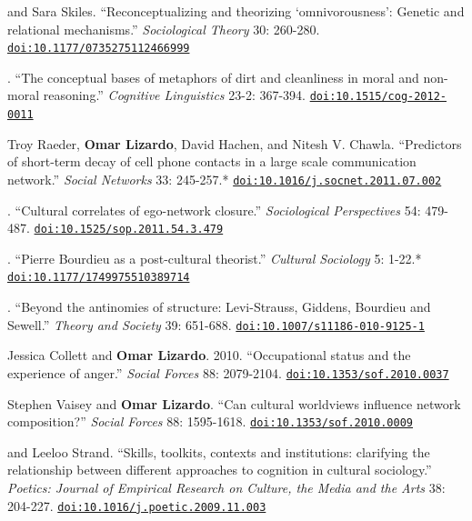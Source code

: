

 and Sara Skiles. ``Reconceptualizing and theorizing ‘omnivorousness’: Genetic and relational mechanisms.'' {\em Sociological Theory} 30: 260-280. \href{https://doi.org/10.1177/0735275112466999}{\nolinkurl{doi:10.1177/0735275112466999}}

.  ``The conceptual bases of metaphors of dirt and cleanliness in moral and non-moral reasoning.'' {\em Cognitive Linguistics} 23-2: 367-394. \href{https://doi.org/10.1515/cog-2012-0011}{\nolinkurl{doi:10.1515/cog-2012-0011}}

\ind Troy Raeder, {\bf Omar Lizardo}, David Hachen, and Nitesh V. Chawla. ``Predictors of short-term decay of cell phone contacts in a large scale communication network.'' {\em Social Networks} 33: 245-257.\textcolor{uclablue}{*} \href{https://doi.org/10.1016/j.socnet.2011.07.002}{\nolinkurl{doi:10.1016/j.socnet.2011.07.002}}

. ``Cultural correlates of ego-network closure.''  {\em Sociological Perspectives} 54: 479-487. \href{https://doi.org/10.1525/sop.2011.54.3.479}{\nolinkurl{doi:10.1525/sop.2011.54.3.479}}

. ``Pierre Bourdieu as a post-cultural theorist.''  {\em Cultural Sociology} 5: 1-22.\textcolor{uclablue}{*} \href{https://doi.org/10.1177/1749975510389714}{\nolinkurl{doi:10.1177/1749975510389714}}


. ``Beyond the antinomies of structure: Levi-Strauss, Giddens, Bourdieu and Sewell.''  {\em Theory and Society} 39:  651-688. \newline \href{https://doi.org/10.1007/s11186-010-9125-1}{\nolinkurl{doi:10.1007/s11186-010-9125-1}}

\ind Jessica Collett and {\bf Omar Lizardo}. 2010. ``Occupational status and the experience of anger.''  {\em Social Forces} 88: 2079-2104. \href{https://doi.org/10.1353/sof.2010.0037}{\nolinkurl{doi:10.1353/sof.2010.0037}}

\ind Stephen Vaisey and {\bf Omar Lizardo}. ``Can cultural worldviews influence network composition?''  {\em Social Forces} 88: 1595-1618. \href{https://doi.org/10.1353/sof.2010.0009}{\nolinkurl{doi:10.1353/sof.2010.0009}}

 and Leeloo Strand. ``Skills, toolkits, contexts and institutions: clarifying the relationship between different approaches to  cognition in cultural sociology.''  {\em Poetics: Journal of Empirical Research on Culture, the Media and the Arts} 38: 204-227. \href{https://doi.org/10.1016/j.poetic.2009.11.003}{\nolinkurl{doi:10.1016/j.poetic.2009.11.003}}
